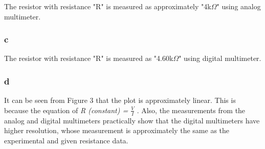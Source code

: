 \documentclass[letterpaper,12pt]{article}
\begin{document}
The resistor with resistance "R" is measured as approximately "4k\(\Omega\)" using analog multimeter.
\subsubsection{c}

The resistor with resistance "R" is measured as  "4.60k\(\Omega\)" using digital multimeter.

\subsubsection{d}
It can be seen from Figure 3 that the plot is approximately linear. This is because the equation of  \emph{ R (constant) = \(\frac{V}{I}\) } . Also, the measurements from the analog and digital multimeters practically show that the digital multimeters have higher resolution, whose measurement is approximately the same as the experimental and given resistance data.
\end{document}
